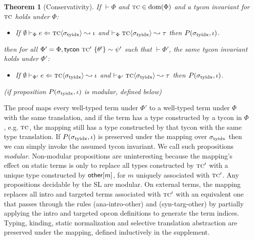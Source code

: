 \documentclass[10pt,preprint]{sigplanconf}
\newtheorem{theorem}{Theorem}
\newenvironment{proof-sketch}{\noindent{\emph{Proof Sketch.}}}{\qed}
\begin{document}
\begin{theorem}[Conservativity] If $\vdash \Phi$ and $\textsc{tc} \in \text{dom}(\Phi)$ and a tycon invariant for $\textsc{tc}$ holds under $\Phi$: \begin{itemize}
\item If $\emptyset \vdash_{\Phi} e \Leftarrow {\textsc{tc}}\langle\sigma_\text{tyidx}\rangle \leadsto \iota$ and $\vdash_\Phi {{\textsc{tc}}\langle\sigma_\text{tyidx}\rangle} \leadsto \tau$  then $P(\sigma_\text{tyidx}, \iota)$.
\end{itemize} then for all $\Phi' = \Phi, {\sf tycon}~\textsc{tc}' ~\{\theta'\} \sim \psi'$ such that $\vdash \Phi'$, the same tycon invariant holds under $\Phi'$: \begin{itemize}
\item If $\emptyset \vdash_{\Phi'} e \Leftarrow {\textsc{tc}}\langle\sigma_\text{tyidx}\rangle \leadsto \iota$ and $\vdash_{\Phi'}{{\textsc{tc}}\langle\sigma_\text{tyidx}\rangle}\leadsto{\tau}$ then $P(\sigma_\text{tyidx}, \iota)$.
\end{itemize}
(if proposition $P(\sigma_\text{tyidx}, \iota)$ is \emph{modular}, defined below)
\end{theorem}
\begin{proof-sketch}
The proof maps every well-typed term under $\Phi'$ to a well-typed term under $\Phi$ with the same translation, and if the term has a type constructed by a tycon in $\Phi$, e.g. $\textsc{tc}$, the mapping still has a type constructed by that tycon with the same type translation. If $P(\sigma_\text{tyidx}, \iota)$ is preserved under the mapping over $\sigma_\text{tyidx}$ then we can simply invoke the assumed tycon invariant. We call such propositions \emph{modular}. Non-modular propositions are uninteresting because the mapping's effect on static terms is only to replace all types constructed by $\textsc{tc}'$ with a unique type constructed by ${\sf other}[m]$, for $m$ uniquely associated with $\textsc{tc}'$. Any propositions decidable by the SL are modular. On external terms, the mapping replaces all intro and targeted terms associated with $\textsc{tc}'$ with an equivalent one that passes through the rules (ana-intro-other) and (syn-targ-other) by partially applying the intro and targeted opcon definitions to generate the term indices. Typing, kinding, static normalization and selective translation abstraction are preserved under the mapping, defined inductively in the supplement. \end{proof-sketch}
\end{document}
